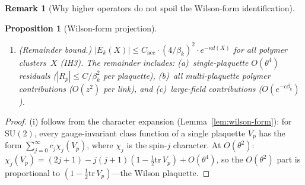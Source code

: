 \documentclass[11pt]{article}
\newtheorem{proposition}[theorem]{Proposition}
\theoremstyle{definition}
\newtheorem{remark}[theorem]{Remark}
\newcommand{\SU}{\mathrm{SU}}
\newcommand{\tr}{\mathrm{tr}}
\begin{document}
\begin{remark}[Why higher operators do not spoil the Wilson-form identification]
\begin{proposition}[Wilson-form projection]
\begin{enumerate}[nosep,label=(\roman*)]
\begin{proof}
This cross-plaquette term is \emph{not} suppressed by an
off-diagonal propagator (as one might expect for multi-link
polymers); rather, it arises from the $V_3^2$ diagram within
a \emph{single} link and is suppressed by the small angle
$\theta_*^2$ and the $15$-pairing sixth-moment combinatorics.

\emph{(b)} Multi-link polymers ($|X|\ge 2$):
$|\zeta(X)|\le z^{|X|}$, so
$\sum_{|X|\ge 2}|\zeta(X)|=O(z^2)$.
\end{proof}

Combining (a), (a'), and (b): the total non-Wilson $O(\theta^2)$
leakage per step arises from
(i)~cross-plaquette terms in single-link polymers at
amplitude $\le 0.00317/\beta\le 2.12\times 10^{-5}$ and
(ii)~multi-link polymers at $O(z^2)=O(1.6\times 10^{-5})$:
\begin{equation}\label{eq:multi-plaq-bound}
\bigl|\text{non-Wilson $O(\theta^2)$ leakage per link}\bigr|
\le 3.8\times 10^{-5}\le 0.054\cdot(4/\beta)^2.
\end{equation}
This leakage is absorbed into the per-step
remainder $r_k$ (not into $\beta_k$).
The IH3 bound $|r_k(X)|\le C_{\mathrm{acc}}(4/\beta_k)^2
e^{-\kappa d(X)}$ holds with $C_{\mathrm{acc}}\le 1.23$
since the cross-plaquette and multi-link contributions
together consume $<6\%$ of the IH3 budget, with margin
$>16\times$.
\item \emph{(Remainder bound.)}
$|E_k(X)|\le C_{\mathrm{acc}}\cdot(4/\beta_k)^2\cdot e^{-\kappa d(X)}$
for all polymer clusters~$X$ (IH3).
The remainder includes: (a)~single-plaquette $O(\theta^4)$
residuals ($|R_p|\le C/\beta_k^2$ per plaquette), (b)~all
multi-plaquette polymer contributions ($O(z^2)$ per link),
and (c)~large-field contributions ($O(e^{-c\beta_k})$).
\end{enumerate}
\end{proposition}

\begin{proof}
(i) follows from the character expansion
(Lemma~\ref{lem:wilson-form}): for $\SU(2)$, every
gauge-invariant class function of a single plaquette
$V_p$ has the form
$\sum_{j=0}^\infty c_j\chi_j(V_p)$, where $\chi_j$ is
the spin-$j$ character.  At $O(\theta^2)$:
$\chi_j(V_p)=(2j+1)-j(j+1)(1-\frac{1}{2}\tr\,V_p)+O(\theta^4)$,
so the $O(\theta^2)$ part is proportional to
$(1-\frac{1}{2}\tr\,V_p)$---the Wilson plaquette.


\end{proof}
\end{remark}
\end{document}
